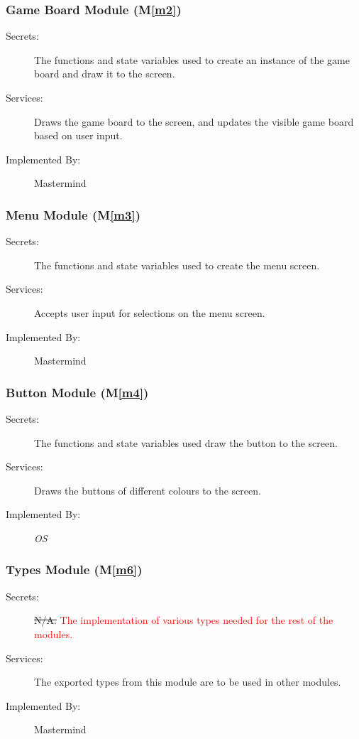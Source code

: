 \documentclass[12pt, titlepage]{article}
\newcommand{\mref}[1]{M\ref{#1}}
\begin{document}
\subsubsection{Game Board Module (\mref{m2})}

\begin{description}
\item[Secrets:]The functions and state variables used to create an instance of the game board and draw it to the screen.
\item[Services:] Draws the game board to the screen, and updates the visible game board based on user input.
\item[Implemented By:] Mastermind
\end{description}

\subsubsection{Menu Module (\mref{m3})}

\begin{description}
\item[Secrets:] The functions and state variables used to create the menu screen.
\item[Services:] Accepts user input for selections on the menu screen.
\item[Implemented By:] Mastermind
\end{description}

\subsubsection{Button Module (\mref{m4})}

\begin{description}
\item[Secrets:] The functions and state variables used draw the button to the screen.
\item[Services:] Draws the buttons of different colours to the screen.
\item[Implemented By:]  \emph{OS}
\end{description}

\subsubsection{Types Module (\mref{m6})}

\begin{description}
\item[Secrets:] \sout{N/A.} \textcolor{red}{The implementation of various types needed for the rest of the modules.}
\item[Services:] The exported types from this module are to be used in other modules. 
\item[Implemented By:]  Mastermind
\end{description}
\end{document}
